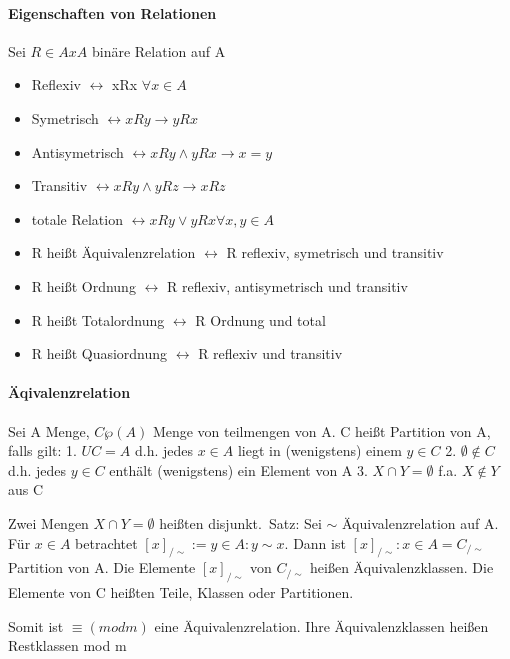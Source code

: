\documentclass[10pt,landscape]{article}
\begin{document}
\begin{multicols}{3}
\paragraph{Eigenschaften von Relationen}
Sei $R\in AxA$ binäre Relation auf A
\begin{itemize}
    \item Reflexiv $\leftrightarrow$ xRx $\forall x \in A$
    \item Symetrisch $\leftrightarrow xRy \rightarrow yRx$
    \item Antisymetrisch $\leftrightarrow xRy \wedge yRx \rightarrow x=y$
    \item Transitiv $\leftrightarrow xRy \wedge yRz \rightarrow xRz$
    \item totale Relation $\leftrightarrow xRy \vee yRx  \forall x,y \in A$
\end{itemize}
\begin{itemize}
    \item R heißt Äquivalenzrelation $\leftrightarrow$ R reflexiv, symetrisch und transitiv
    \item R heißt Ordnung $\leftrightarrow$ R reflexiv, antisymetrisch und transitiv
    \item R heißt Totalordnung $\leftrightarrow$ R Ordnung und total
    \item R heißt Quasiordnung $\leftrightarrow$ R reflexiv und transitiv
\end{itemize}

\paragraph{Äqivalenzrelation}
Sei A Menge, $C\wp (A)$ Menge von teilmengen von A. C heißt Partition von A, falls gilt:
1. $UC=A$ d.h. jedes $x\in A$ liegt in (wenigstens) einem $y\in C$
2. $\emptyset \not \in C$ d.h. jedes $y\in C$ enthält (wenigstens) ein Element von A
3. $X \cap Y = \emptyset$ f.a. $X\not \in Y$ aus C

Zwei Mengen $X\cap Y = \emptyset$ heißten disjunkt.\
Satz: Sei $\sim$ Äquivalenzrelation auf A. Für $x\in A$ betrachtet $[x]_{/ \sim }:={y\in A: y \sim x}$. Dann ist ${[x]_{/ \sim }:x\in A}= C_{/ \sim }$ Partition von A. Die Elemente $[x]_{/ \sim }$ von $C_{/ \sim }$ heißen Äquivalenzklassen. Die Elemente von C heißten Teile, Klassen oder Partitionen.

Somit ist $\equiv(mod m)$ eine Äquivalenzrelation. Ihre Äquivalenzklassen heißen Restklassen mod m


\end{multicols}
\end{document}
